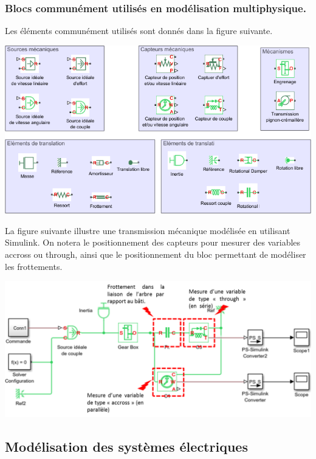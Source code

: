\documentclass[10pt,fleqn]{article} %
\begin{document}
\subsubsection{Blocs communément utilisés en modélisation multiphysique.}
Les éléments communément utilisés sont donnés dans la figure suivante. 

\begin{center}
\includegraphics[width=.9\linewidth]{images/Bilbio_SimMeca}
\end{center}

La figure suivante illustre une transmission mécanique modélisée en utilisant Simulink. On notera le positionnement des capteurs pour mesurer des variables accross ou through, ainsi que le positionnement du bloc permettant de modéliser les frottements.

\begin{center}
\includegraphics[width=.9\linewidth]{images/transmission_meca}
\end{center}

\subsection{Modélisation des systèmes électriques}
\end{document}
